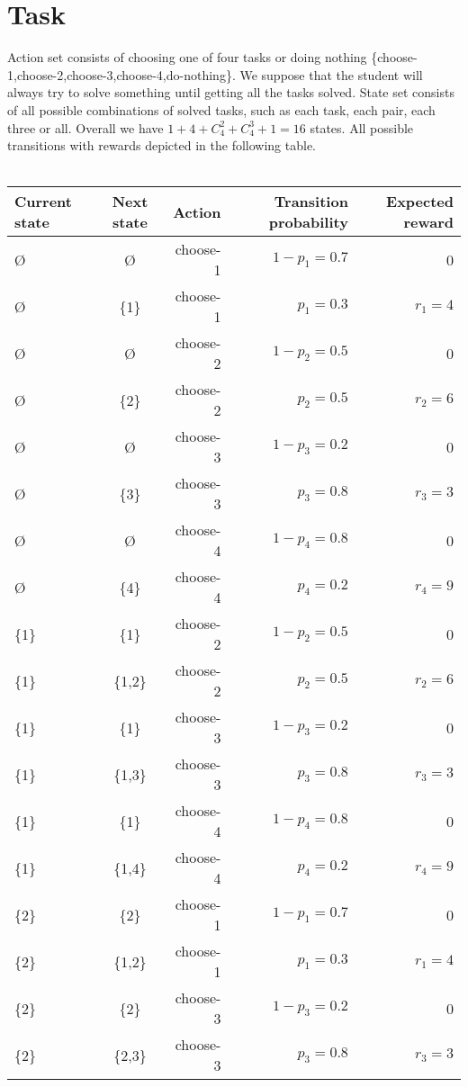 \documentclass[english]{scrartcl}
\begin{document}
\section{Task}
Action set consists of choosing one of four tasks or doing nothing \{choose-1,choose-2,choose-3,choose-4,do-nothing\}. We suppose that the student will always try to solve something until getting all the tasks solved. State set consists of all possible combinations of solved tasks, such as each task, each pair, each three or all. Overall we have $1 + 4 + C_{4}^{2} + C_{4}^{3} + 1 = 16$ states. All possible transitions with rewards depicted in the following table.
\\
\\
\begin{tabular}{ l | c | r | r | r }
  \hline                       
  Current state & Next state & Action & Transition probability & Expected reward \\ \hline
  \O & \O & choose-1 & $1 - p_{1}=0.7$ & 0 \\
  \O & \{1\} & choose-1 & $p_{1}=0.3$ & $r_{1}=4$ \\
  \O & \O & choose-2 & $1 - p_{2}=0.5$ & 0 \\
  \O & \{2\} & choose-2 & $p_{2}=0.5$ & $r_{2}=6$ \\
  \O & \O & choose-3 & $1 - p_{3}=0.2$ & 0 \\
  \O & \{3\} & choose-3 & $p_{3}=0.8$ & $r_{3}=3$ \\
  \O & \O & choose-4 & $1 - p_{4}=0.8$ & 0 \\
  \O & \{4\} & choose-4 & $p_{4}=0.2$ & $r_{4}=9$ \\
  \{1\} & \{1\} & choose-2 & $1 - p_{2}=0.5$ & 0 \\
  \{1\} & \{1,2\} & choose-2 & $p_{2}=0.5$ & $r_{2}=6$ \\
  \{1\} & \{1\} & choose-3 & $1 - p_{3}=0.2$ & 0 \\
  \{1\} & \{1,3\} & choose-3 & $p_{3}=0.8$ & $r_{3}=3$ \\
  \{1\} & \{1\} & choose-4 & $1 - p_{4}=0.8$ & 0 \\
  \{1\} & \{1,4\} & choose-4 & $p_{4}=0.2$ & $r_{4}=9$ \\
  \{2\} & \{2\} & choose-1 & $1 - p_{1}=0.7$ & 0 \\
  \{2\} & \{1,2\} & choose-1 & $p_{1}=0.3$ & $r_{1}=4$ \\
  \{2\} & \{2\} & choose-3 & $1 - p_{3}=0.2$ & 0 \\
  \{2\} & \{2,3\} & choose-3 & $p_{3}=0.8$ & $r_{3}=3$ \\

\end{tabular}
\end{document}
